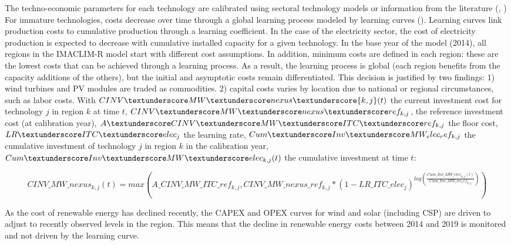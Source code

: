 The techno-economic parameters for each technology are calibrated using sectoral technology models or information from the literature (\cite{IEA2020}, \cite{IRENA2020})
For immature technologies, costs decrease over time through a global learning process modeled by learning curves (\cite{Neij2008}). Learning curves link production costs to cumulative production through a learning coefficient. In the case of the electricity sector, the cost of electricity production is expected to decrease with cumulative installed capacity for a given technology. In the base year of the model (2014), all regions in the IMACLIM-R model start with different cost assumptions. In addition, minimum costs are defined in each region: these are the lowest costs that can be achieved through a learning process. As a result, the learning process is global (each region benefits from the capacity additions of the others), but the initial and asymptotic costs remain differentiated. This decision is justified by two findings: 1) wind turbines and PV modules are traded as commodities. 2) capital costs varies by location due to national or regional circumstances, such as labor costs. With $CINV \textunderscore MW \textunderscore nexus\textunderscore {k,j}(t)$ the current investment cost for technology $j$ in region $k$ at time $t$, $CINV\textunderscore MW \textunderscore nexus\textunderscore ref_{k,j}$, the reference investment cost (at calibration year), $A\textunderscore CINV\textunderscore MW \textunderscore ITC\textunderscore ref_{k,j}$ the floor cost, $LR\textunderscore ITC\textunderscore elec_{j}$ the learning rate, $Cum\textunderscore Inv\textunderscore MW_ elec_ ref_{k,j}$ the cumulative investment of technology $j$ in region $k$ in the calibration year, $Cum\textunderscore Inv\textunderscore MW \textunderscore elec_{k,j}(t)$ the cumulative investment at time $t$:

\begin{dmath}
    CINV\_MW\_nexus_{k,j}(t) = max(A\_CINV\_MW\_ITC\_ref_{k,j},CINV\_MW\_nexus \_ref_{k,j}*(1-LR\_ ITC\_elec_{j})^{log(\frac{Cum\_Inv\_MW\_elec_{k,j}(t)}{Cum\_Inv\_MW_elec_ ref_{k,j}})})
    \label{eqn:LR}
\end{dmath}

As the cost of renewable energy has declined recently, the CAPEX and OPEX curves for wind and solar (including CSP) are driven to adjust to recently observed levels in the region. This means that the decline in renewable energy costs between 2014 and 2019 is monitored and not driven by the learning curve.

